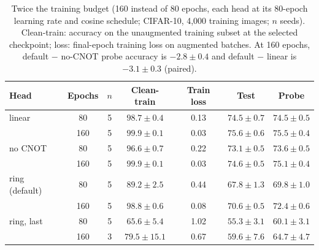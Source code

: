 \begin{table}[h]
\centering
\caption{Twice the training budget (160 instead of 80 epochs, each head at its 80-epoch learning
rate and cosine schedule; CIFAR-10, 4,000 training images; $n$ seeds). Clean-train:
accuracy on the unaugmented training subset at the selected checkpoint; loss: final-epoch
training loss on augmented batches. At 160 epochs, default $-$ no-CNOT probe accuracy is
$-2.8 \pm 0.4$ and default $-$ linear is $-3.1 \pm 0.3$ (paired).}
\label{tab:budget}
\small
\begin{tabular}{lcccccc}
\toprule
Head & Epochs & $n$ & Clean-train & Train loss & Test & Probe \\
\midrule
linear & 80 & 5 & $98.7 \pm 0.4$ & 0.13 & $74.5 \pm 0.7$ & $74.5 \pm 0.5$ \\
 & 160 & 5 & $99.9 \pm 0.1$ & 0.03 & $75.6 \pm 0.6$ & $75.5 \pm 0.4$ \\
no CNOT & 80 & 5 & $96.6 \pm 0.7$ & 0.22 & $73.1 \pm 0.5$ & $73.6 \pm 0.5$ \\
 & 160 & 5 & $99.9 \pm 0.1$ & 0.03 & $74.6 \pm 0.5$ & $75.1 \pm 0.4$ \\
ring (default) & 80 & 5 & $89.2 \pm 2.5$ & 0.44 & $67.8 \pm 1.3$ & $69.8 \pm 1.0$ \\
 & 160 & 5 & $98.8 \pm 0.6$ & 0.08 & $70.6 \pm 0.5$ & $72.4 \pm 0.6$ \\
ring, last & 80 & 5 & $65.6 \pm 5.4$ & 1.02 & $55.3 \pm 3.1$ & $60.1 \pm 3.1$ \\
 & 160 & 3 & $79.5 \pm 15.1$ & 0.67 & $59.6 \pm 7.6$ & $64.7 \pm 4.7$ \\
\bottomrule
\end{tabular}
\end{table}
